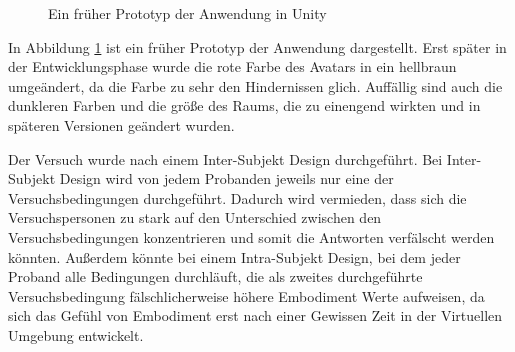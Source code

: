 \begin{figure}[h]
  \caption[Altes Setup der Anwendung]{Ein früher Prototyp der Anwendung in Unity}
  \label{fig:oldSetup}
\end{figure}

In Abbildung \ref{fig:oldSetup} ist ein früher Prototyp der Anwendung dargestellt. Erst später in der Entwicklungsphase wurde die rote Farbe des Avatars in ein hellbraun umgeändert, da die Farbe zu sehr den Hindernissen glich. Auffällig sind auch die dunkleren Farben und die größe des Raums, die zu einengend wirkten und in späteren Versionen geändert wurden.

Der Versuch wurde nach einem Inter-Subjekt Design durchgeführt. Bei Inter-Subjekt Design wird von jedem Probanden jeweils nur eine der Versuchsbedingungen durchgeführt. Dadurch wird vermieden, dass sich die Versuchspersonen zu stark auf den Unterschied zwischen den Versuchsbedingungen konzentrieren und somit die Antworten verfälscht werden könnten. Außerdem könnte bei einem Intra-Subjekt Design, bei dem jeder Proband alle Bedingungen durchläuft, die als zweites durchgeführte Versuchsbedingung fälschlicherweise höhere Embodiment Werte aufweisen, da sich das Gefühl von Embodiment erst nach einer Gewissen Zeit in der Virtuellen Umgebung entwickelt.


